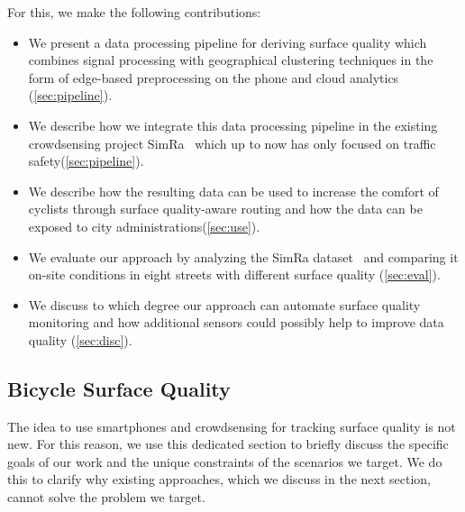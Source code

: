 For this, we make the following contributions:
\begin{itemize}
	\item We present a data processing pipeline for deriving surface quality which combines signal processing with geographical clustering techniques in the form of edge-based preprocessing on the phone and cloud analytics (\cref{sec:pipeline}).
	\item We describe how we integrate this data processing pipeline in the existing crowdsensing project SimRa~\cite{karakaya2020simra} which up to now has only focused on traffic safety(\cref{sec:pipeline}).
	\item We describe how the resulting data can be used to increase the comfort of cyclists through surface quality-aware routing and how the data can be exposed to city administrations(\cref{sec:use}).
	\item We evaluate our approach by analyzing the SimRa dataset~\cite{dataset_simra_set1,dataset_simra_set2,dataset_simra_set3} and comparing it on-site conditions in eight streets with different surface quality (\cref{sec:eval}).
	\item We discuss to which degree our approach can automate surface quality monitoring and how additional sensors could possibly help to improve data quality (\cref{sec:disc}).
\end{itemize}


\subsection{Bicycle Surface Quality}
\label{subsec:surface_quality_background}
The idea to use smartphones and crowdsensing for tracking surface quality is not new.
For this reason, we use this dedicated section to briefly discuss the specific goals of our work and the unique constraints of the scenarios we target.
We do this to clarify why existing approaches, which we discuss in the next section, cannot solve the problem we target.

